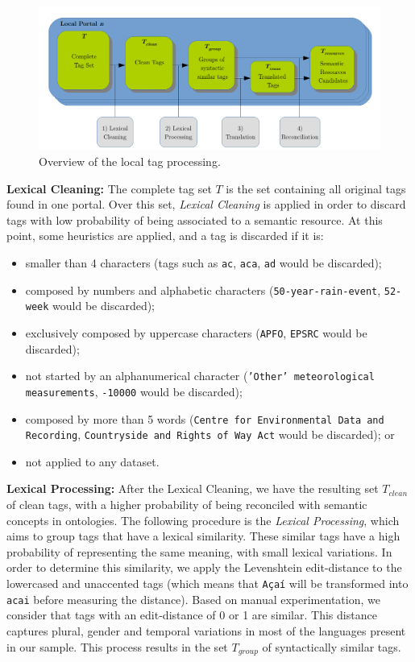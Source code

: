 \begin{figure}[t]
\begin{center}
\includegraphics[width=\columnwidth]{images/local_processing.pdf}
\caption{Overview of the local tag processing.}
\label{fig:local_processing}
\end{center}
\end{figure}

\noindent \textbf{Lexical Cleaning: }The complete tag set $T$ is the set containing all original tags found in one portal.
Over this set, \emph{Lexical Cleaning} is applied in order to discard tags with low probability of being associated to a semantic resource.
At this point, some heuristics are applied, and a tag is discarded if it is: 
\begin{itemize}
	\item smaller than 4 characters (tags such as \texttt{ac}, \texttt{aca}, \texttt{ad} would be discarded); 
	\item composed by numbers and alphabetic characters (\texttt{50-year-rain-event}, \texttt{52-week} would be discarded);
	\item exclusively composed by uppercase characters (\texttt{APFO}, \texttt{EPSRC} would be discarded);
	\item not started by an alphanumerical character (\texttt{'Other' meteorological measurements}, \texttt{-10000} would be discarded);
	\item composed by more than 5 words (\texttt{Centre for Environmental Data and Recording}, \texttt{Countryside and Rights of Way Act} would be discarded); or
	\item not applied to any dataset.
\end{itemize}

\noindent \textbf{Lexical Processing:} After the Lexical Cleaning, we have the resulting set $T_{clean}$ of clean tags, with a higher probability of being reconciled with semantic concepts in ontologies.
The following procedure is the \emph{Lexical Processing}, which aims to group tags that have a lexical similarity.
These similar tags have a high probability of representing the same meaning, with small lexical variations.
In order to determine this similarity, we apply the Levenshtein edit-distance to the lowercased and unaccented tags (which means that \texttt{Açaí} will be transformed into \texttt{acai} before measuring the distance).
Based on manual experimentation, we consider that tags with an edit-distance of 0 or 1 are similar.
This distance captures plural, gender and temporal variations in most of the languages present in our sample.
This process results in the set $T_{group}$ of syntactically similar tags.

